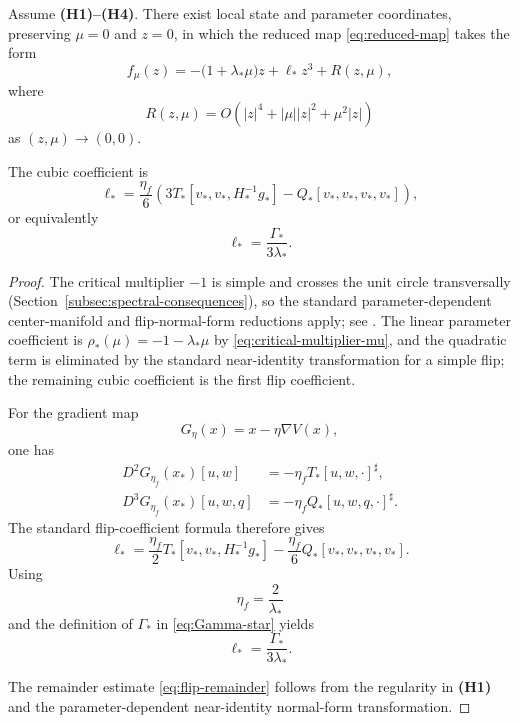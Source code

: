 \begin{proposition}
\label{prop:flip-normal-form}
Assume \textbf{(H1)--(H4)}.
There exist local state and parameter coordinates, preserving
$\mu=0$ and $z=0$, in which the reduced map
\eqref{eq:reduced-map} takes the form
\begin{equation}
f_\mu(z)
=
-\bigl(1+\lambda_*\mu\bigr)z
+
\ell_*z^3
+
R(z,\mu),
\label{eq:flip-normal-form}
\end{equation}
where
\begin{equation}
R(z,\mu)
=
O\left(
|z|^4
+
|\mu||z|^2
+
\mu^2|z|
\right)
\label{eq:flip-remainder}
\end{equation}
as $(z,\mu)\to(0,0)$.

The cubic coefficient is
\begin{equation}
\ell_*
=
\frac{\eta_f}{6}
\left(
3T_*[v_*,v_*,H_*^{-1}g_*]
-
Q_*[v_*,v_*,v_*,v_*]
\right),
\label{eq:flip-coefficient-section3}
\end{equation}
or equivalently
\begin{equation}
\ell_*
=
\frac{\Gamma_*}{3\lambda_*}.
\label{eq:flip-coefficient-Gamma}
\end{equation}
\end{proposition}

\begin{proof}
The critical multiplier $-1$ is simple and crosses the unit circle
transversally (Section~\ref{subsec:spectral-consequences}), so the
standard parameter-dependent center-manifold and flip-normal-form
reductions apply; see \cite{Carr1981,HirschPughShub1977,Kuznetsov2004}.
The linear parameter coefficient is $\rho_*(\mu)=-1-\lambda_*\mu$
by \eqref{eq:critical-multiplier-mu}, and the quadratic term is
eliminated by the standard near-identity transformation for a simple
flip; the remaining cubic coefficient is the first flip coefficient.

For the gradient map
\[
G_\eta(x)=x-\eta\nabla V(x),
\]
one has
\begin{align}
D^2G_{\eta_f}(x_*)[u,w]
&=
-\eta_f
T_*[u,w,\cdot]^\sharp,
\label{eq:D2G}
\\
D^3G_{\eta_f}(x_*)[u,w,q]
&=
-\eta_f
Q_*[u,w,q,\cdot]^\sharp.
\label{eq:D3G}
\end{align}
The standard flip-coefficient formula therefore gives
\[
\ell_*
=
\frac{\eta_f}{2}
T_*[v_*,v_*,H_*^{-1}g_*]
-
\frac{\eta_f}{6}
Q_*[v_*,v_*,v_*,v_*].
\]
Using
\[
\eta_f=\frac{2}{\lambda_*}
\]
and the definition of $\Gamma_*$ in
\eqref{eq:Gamma-star} yields
\[
\ell_*
=
\frac{\Gamma_*}{3\lambda_*}.
\]

The remainder estimate
\eqref{eq:flip-remainder} follows from the regularity in
\textbf{(H1)} and the parameter-dependent near-identity normal-form
transformation.
\end{proof}

